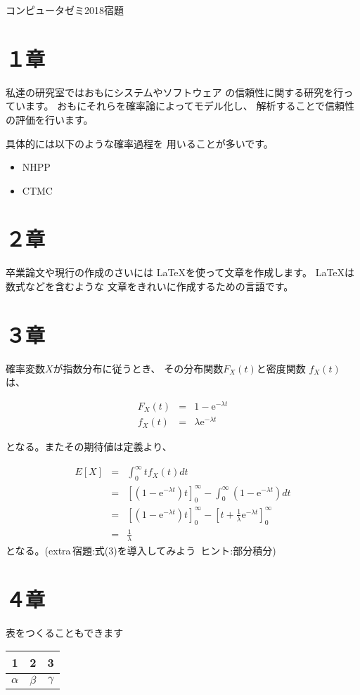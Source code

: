\documentclass[a4paper,12pt]{article}
\begin{document}
\begin{center}
\Huge{コンピュータゼミ2018宿題}
\end{center}
    
    \section{１章}
    私達の研究室ではおもにシステムやソフトウェア
    の信頼性に関する研究を行っています。
    おもにそれらを確率論によってモデル化し、
    解析することで信頼性の評価を行います。
    
    具体的には以下のような確率過程を
    用いることが多いです。
    
    \begin{itemize}
        \item NHPP
        \item CTMC
    \end{itemize}    
        
    \section{２章}
    卒業論文や現行の作成のさいには
    \LaTeX を使って文章を作成します。
    \LaTeX は数式などを含むような
    文章をきれいに作成するための言語です。
    
    \section{３章}
    確率変数$X$が指数分布に従うとき、
    その分布関数$F_X(t)$と密度関数
    $f_X(t)$は、
    
    \begin{eqnarray}
    F_X(t)&=&1-\mathrm{e}^{-\lambda t} \\
    f_X(t)&=&\lambda \mathrm{e}^{-\lambda t} 
    \end{eqnarray}
    
    となる。またその期待値は定義より、
    
    \begin{eqnarray}
    E[X]&=&\int_0^{\infty} tf_X(t)dt \nonumber \\
        &=&[ (1-\mathrm{e}^{-\lambda t})t]_0^{\infty}-\int_0^\infty(1-\mathrm{e}^{-\lambda t})dt \nonumber \\
        &=&[ (1-\mathrm{e}^{-\lambda t})t]_0^{\infty}-[ t+\frac{1}{\lambda}\mathrm{e}^{-\lambda t}]_0^{\infty} \nonumber \\
        &=&\frac{1}{\lambda}
    \end{eqnarray}
    となる。(extra\,宿題:式(3)を導入してみよう
    \,ヒント:部分積分)
    
    \section{４章}
    表をつくることもできます
    \begin{table}[htb]
    \centering
        \begin{tabular}{|c|c|c|} \hline
            1 & 2 & 3 \\ \hline
            $\alpha$ & $\beta$ & $\gamma$ \\ \hline
        \end{tabular}
    \end{table}
\end{document}
